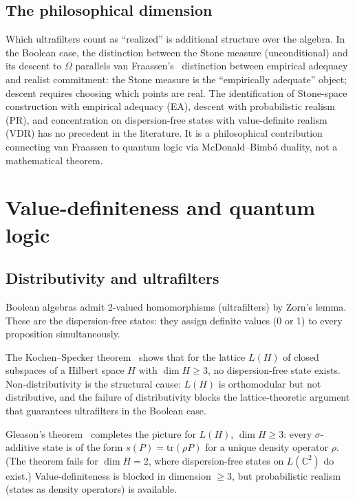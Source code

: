 \subsection{The philosophical dimension}
\label{sec:ea-pr-vdr}

Which ultrafilters count as ``realized'' is additional structure
over the algebra.  In the Boolean case, the distinction between the
Stone measure (unconditional) and its descent to $\Omega$ parallels
van Fraassen's~\cite{vanFraassen1980} distinction between empirical
adequacy and realist commitment: the Stone measure is the
``empirically adequate'' object; descent requires choosing which
points are real.  The identification of Stone-space construction
with empirical adequacy (EA), descent with probabilistic realism
(PR), and concentration on dispersion-free states with value-definite
realism (VDR) has no precedent in the literature.  It is a
philosophical contribution connecting van Fraassen to quantum logic
via McDonald--Bimb\'{o} duality, not a mathematical theorem.

\section{Value-definiteness and quantum logic}
\label{sec:vdr}

\subsection{Distributivity and ultrafilters}

Boolean algebras admit 2-valued homomorphisms (ultrafilters) by
Zorn's lemma.  These are the dispersion-free states: they assign
definite values (0 or 1) to every proposition simultaneously.

The Kochen--Specker theorem~\cite{KochenSpecker1967} shows that
for the lattice $L(H)$ of closed subspaces of a Hilbert space $H$
with $\dim H \geq 3$, no dispersion-free state exists.
Non-distributivity is the structural cause: $L(H)$ is orthomodular
but not distributive, and the failure of distributivity blocks the
lattice-theoretic argument that guarantees ultrafilters in the
Boolean case.

Gleason's theorem~\cite{Gleason1957} completes the picture for
$L(H)$, $\dim H \geq 3$: every $\sigma$-additive state is of the
form $s(P) = \mathrm{tr}(\rho P)$ for a unique density operator
$\rho$.  (The theorem fails for $\dim H = 2$, where
dispersion-free states on $L(\mathbb{C}^2)$ do exist.)
Value-definiteness is blocked in dimension $\geq 3$, but
probabilistic realism (states as density operators) is available.


